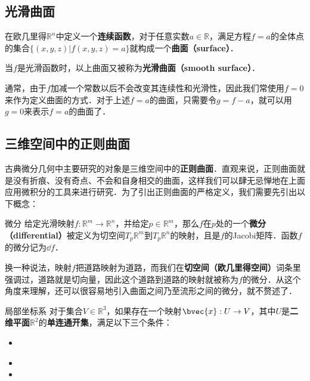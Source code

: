 
\subsection{光滑曲面}

在欧几里得$\mathbb{R}^n$中定义一个\textbf{连续函数}，对于任意实数$a\in\mathbb{R}$，满足方程$f=a$的全体点的集合$\{(x, y, z)|f(x, y, z)=a\}$就构成一个\textbf{曲面（surface）}．

当$f$是光滑函数时，以上曲面又被称为\textbf{光滑曲面（smooth surface）}．

通常，由于$f$加减一个常数以后不会改变其连续性和光滑性，因此我们常使用$f=0$来作为定义曲面的方式．对于上述$f=a$的曲面，只需要令$g=f-a$，就可以用$g=0$来表示$f=a$的曲面了．

\subsection{三维空间中的正则曲面}

古典微分几何中主要研究的对象是三维空间中的\textbf{正则曲面}．直观来说，正则曲面就是没有折痕、没有奇点、不会和自身相交的曲面，这样我们可以肆无忌惮地在上面应用微积分的工具来进行研究．为了引出正则曲面的严格定义，我们需要先引出以下概念：

\begin{definition}{微分}
给定光滑映射$f:\mathbb{R}^m\to\mathbb{R}^n$，并给定$p\in\mathbb{R}^m$，那么$f$在$p$处的一个\textbf{微分（differential）}被定义为切空间$T_p\mathbb{R}^m$到$T_p\mathbb{R}^n$的映射，且是$f$的Jacobi矩阵．函数$f$的微分记为$\dd f$．
\end{definition}

换一种说法，映射$f$把道路映射为道路，而我们在\textbf{切空间（欧几里得空间）}词条里强调过，道路就是切向量，因此这个道路到道路的映射就被称为$f$的微分．从这个角度来理解，还可以很容易地引入曲面之间乃至流形之间的微分，就不赘述了．


\begin{definition}{局部坐标系}
对于集合$V\in \mathbb{R}^3$，如果存在一个映射$\bvec{x}:U\to V$，其中$U$是\textbf{二维平面}$\mathbb{R}^2$的\textbf{单连通开集}，满足以下三个条件：
\begin{itemize}
\item \
\item 
\item 
\end{itemize}

\end{definition}
